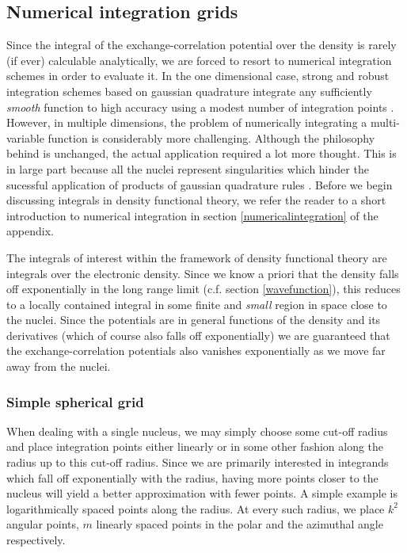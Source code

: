 \documentclass[a4paper]{article}
\newcommand{\comment}[1]{\ignorespaces}
\begin{document}
\subsection{Numerical integration grids}
Since the integral of the exchange-correlation potential over the density is rarely (if ever) calculable analytically, we are forced to resort to numerical integration schemes in order to evaluate it. In the one dimensional case, strong and robust integration schemes based on gaussian quadrature integrate any sufficiently \emph{smooth} function to high accuracy using a modest number of integration points \cite{hjorthjensen}\comment{p116}. However, in multiple dimensions, the problem of numerically integrating a multi-variable function is considerably more challenging. Although the philosophy behind is unchanged, the actual application required a lot more thought. This is in large part because all the nuclei represent singularities which hinder the sucessful application of products of gaussian quadrature rules \cite{voronoi1}. Before we begin discussing integrals in density functional theory, we refer the reader to a short introduction to numerical integration in section \ref{numericalintegration} of the appendix. 

The integrals of interest within the framework of density functional theory are integrals over the electronic density. Since we know a priori that the density falls off exponentially in the long range limit (c.f. section \ref{wavefunction}), this reduces to a locally contained integral in some finite and \emph{small} region in space close to the nuclei. Since the potentials are in general functions of the density and its derivatives (which of course also falls off exponentially) we are guaranteed that the exchange-correlation potentials also vanishes exponentially as we move far away from the nuclei. 

\subsubsection{Simple spherical grid}
When dealing with a single nucleus, we may simply choose some cut-off radius and place integration points either linearly or in some other fashion along the radius up to this cut-off radius. Since we are primarily interested in integrands which fall off exponentially with the radius, having more points closer to the nucleus will yield a better approximation with fewer points. A simple example is logarithmically spaced points along the radius. At every such radius, we place $k^2$ angular points, $m$ linearly spaced points in the polar and the azimuthal angle respectively.
\end{document}
